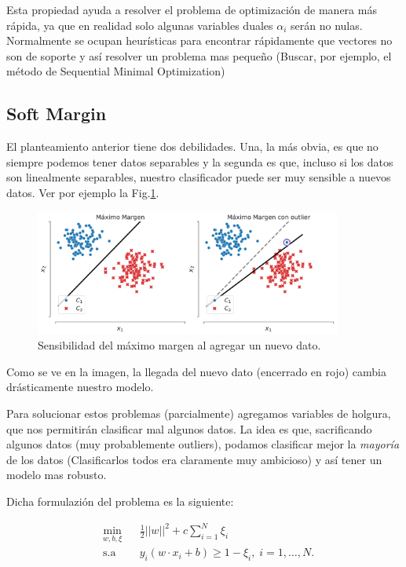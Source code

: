 Esta propiedad ayuda a resolver el problema de optimización de manera más rápida, ya que en realidad solo algunas variables duales $\alpha_i$ serán no nulas. Normalmente se ocupan heurísticas para encontrar rápidamente que vectores no son de soporte y así resolver un problema mas pequeño (Buscar, por ejemplo, el método de Sequential Minimal Optimization) 



\subsection{Soft Margin}


El planteamiento anterior tiene dos debilidades. Una, la más obvia, es que no siempre podemos tener datos separables y la segunda es que, incluso si los datos son linealmente separables, nuestro clasificador puede ser muy sensible a nuevos datos. Ver por ejemplo la Fig.\ref{fig:my_label3}.

\begin{figure}[ht]
    \centering
    \includegraphics[width=0.9\textwidth]{img/cap5_margen_suave}
    \caption{Sensibilidad del máximo margen al agregar un nuevo dato.}
    \label{fig:my_label3}
\end{figure}


Como se ve en la imagen, la llegada del nuevo dato (encerrado en rojo) cambia drásticamente nuestro modelo. 

Para solucionar estos problemas (parcialmente) agregamos variables de holgura, que nos permitirán clasificar mal algunos datos. La idea es que, sacrificando algunos datos (muy probablemente outliers), podamos clasificar mejor la \textit{mayoría} de los datos (Clasificarlos todos era claramente muy ambicioso) y así tener un modelo mas robusto.  


Dicha formulazión del problema es la siguiente:

\begin{equation*}
\begin{aligned}
& \underset{w,b, \xi}{\text{min}}
& & \frac{1}{2}||w||^2 + c\sum\limits_{i=1}^{N} \xi_i \\
& \text{s.a}
& & y_i (w\cdot x_i +b) \geq 1 - \xi_i, \; i = 1, \ldots, N.
\end{aligned}
\end{equation*}

